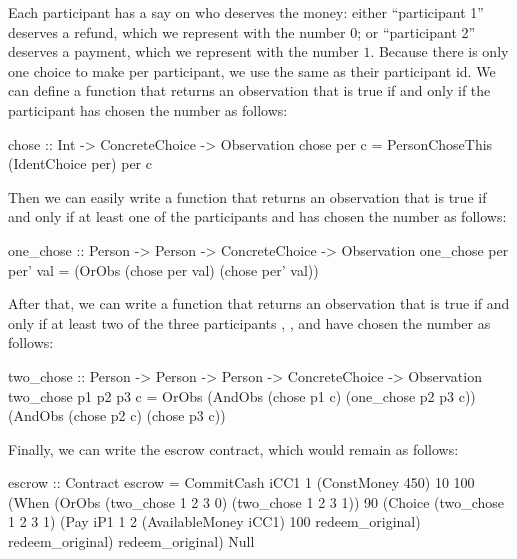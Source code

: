 \documentclass[
      acmsmall
    , screen
  ]{acmart}
\begin{document}
Each participant has a say on who deserves the money: either ``participant 1'' deserves a refund, which we represent 
with the number $0$; or ``participant 2'' deserves a payment, which we represent with the number $1$. Because there is 
only one choice to make per participant, we use the same  as their participant id. We can 
define a function that returns an observation that is true if and only if the participant  has 
chosen the number  as follows:

\begin{haskellcode}
chose :: Int -> ConcreteChoice -> Observation
chose per c = PersonChoseThis (IdentChoice per) per c
\end{haskellcode}

Then we can easily write a function that returns an observation that is true if and only if at least one of the 
participants  and  has chosen the number  as follows:

\begin{haskellcode}
one_chose :: Person -> Person -> ConcreteChoice -> Observation
one_chose per per' val = (OrObs (chose per val) (chose per' val)) 
\end{haskellcode}

After that, we can write a function that returns an observation that is true if and only if at least 
two of the three participants , , and  have chosen the number 
 as follows:

\begin{haskellcode}
two_chose :: Person -> Person -> Person -> ConcreteChoice -> Observation
two_chose p1 p2 p3 c = OrObs (AndObs (chose p1 c) (one_chose p2 p3 c))
                             (AndObs (chose p2 c) (chose p3 c))
\end{haskellcode}

Finally, we can write the escrow contract, which would remain as follows:

\begin{haskellcode}
escrow :: Contract
escrow = CommitCash iCC1 1 (ConstMoney 450) 10 100
                    (When (OrObs (two_chose 1 2 3 0)
                                 (two_chose 1 2 3 1))
                          90
                          (Choice (two_chose 1 2 3 1)
                                  (Pay iP1 1 2 (AvailableMoney iCC1) 100
                                       redeem_original)
                                  redeem_original)
                          redeem_original)
                    Null
\end{haskellcode}
\end{document}
